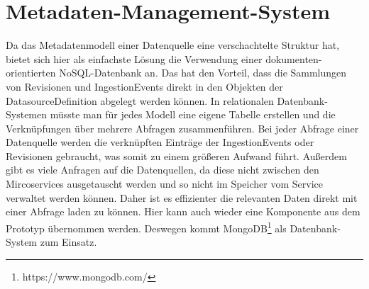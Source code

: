\section{Metadaten-Management-System}

Da das Metadatenmodell einer Datenquelle eine verschachtelte Struktur hat, bietet sich hier als einfachste Lösung die Verwendung einer dokumenten-orientierten NoSQL-Datenbank an.
Das hat den Vorteil, dass die Sammlungen von Revisionen und IngestionEvents direkt in den Objekten der DatasourceDefinition abgelegt werden können.
In relationalen Datenbank-Systemen müsste man für jedes Modell eine eigene Tabelle erstellen und die Verknüpfungen über mehrere Abfragen zusammenführen.
Bei jeder Abfrage einer Datenquelle werden die verknüpften Einträge der IngestionEvents oder Revisionen gebraucht, was somit zu einem größeren Aufwand führt.
Außerdem gibt es viele Anfragen auf die Datenquellen, da diese nicht zwischen den Mircoservices ausgetauscht werden und so nicht im Speicher vom Service verwaltet werden können.
Daher ist es effizienter die relevanten Daten direkt mit einer Abfrage laden zu können.
Hier kann auch wieder eine Komponente aus dem Prototyp übernommen werden.
Deswegen kommt MongoDB\footnote{https://www.mongodb.com/} als Datenbank-System zum Einsatz.
